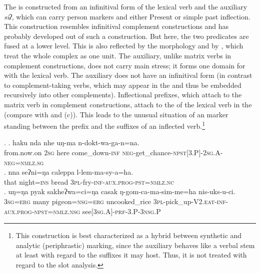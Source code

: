 The   is constructed from an infinitival form of the lexical verb and the auxiliary \emph{siʔ}, which can carry person markers and  either Present or  simple past inflection. This construction resembles infinitival complement constructions and has probably developed out of such a construction. But here, the two predicates are fused at a lower level. This is also reflected by the morphology and by , which treat the whole complex as one unit. The auxiliary, unlike matrix verbs in complement constructions, does not carry main stress; it forms one domain for  with the lexical verb. The auxiliary does not have an infinitival form (in contrast to complement-taking verbs, which may appear in the  and thus be embedded recursively into other complements). Inflectional prefixes, which attach to the matrix verb in complement constructions, attach to the  of the lexical verb in the  (compare \Next[a] with \Next[b] and (c)). This leads to the unusual situation of an  marker standing between the prefix and the suffixes of an inflected verb.\footnote{This construction is best characterized as a hybrid between synthetic and analytic (periphrastic) marking, since the auxiliary behaves like a verbal stem at least with regard to the suffixes it may host. Thus, it is not treated with regard to the slot analysis.} 


\ex. \ag. haku nda nhe uŋ-ma n-dokt-wa-ga-n=na.\\
		from.now.on {\scshape 2sg} here come\_down{\scshape -inf} {\scshape neg-}get\_chance{\scshape -npst[3.P]-2sg.A-neg=nmlz.sg}	\\
	 
 	\bg. nna  seʔni=ŋa       caleppa l-lem-ma-sy-a=ha.\\ 
		that night{\scshape =ins} bread {\scshape 3pl-}fry{\scshape -inf-aux.prog-pst=nmlz.nc}\\
	  
	\bg. uŋ=ŋa   pyak sakheʔwa=ci=ŋa     casak ŋ-gom-ca-ma-sim-me=ha nis-uks-u-ci.\\
 {\scshape 3sg=erg} many  pigeon{\scshape =nsg=erg} uncooked\_rice  {\scshape 3pl}-pick\_up{\scshape -V2.eat-inf-aux.prog-npst=nmlz.nsg} see{\scshape [3sg.A]-prf-3.P-3nsg.P}\\
 



